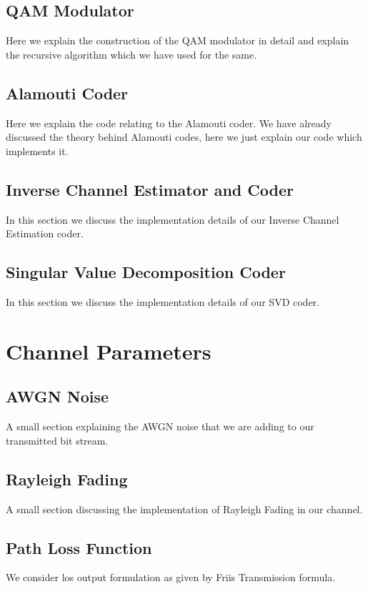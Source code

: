 \subsection{QAM Modulator}
Here we explain the construction of the QAM modulator in detail and explain the recursive algorithm which we have used for the same.

\subsection{Alamouti Coder}
Here we explain the code relating to the Alamouti coder. We have already discussed the theory behind Alamouti codes, here we just explain our code which implements it.


\subsection{Inverse Channel Estimator and Coder}
In this section we discuss the implementation details of our Inverse Channel Estimation coder.


\subsection{Singular Value Decomposition Coder}
In this section we discuss the implementation details of our SVD coder. 

\section{Channel Parameters}

\subsection{AWGN Noise}
A small section explaining the AWGN noise that we are adding to our transmitted bit stream.

\subsection{Rayleigh Fading}
A small section discussing the implementation of Rayleigh Fading in our channel.

\subsection{Path Loss Function}
We consider \acrshort{los} output formulation as given by Friis Transmission formula. 


